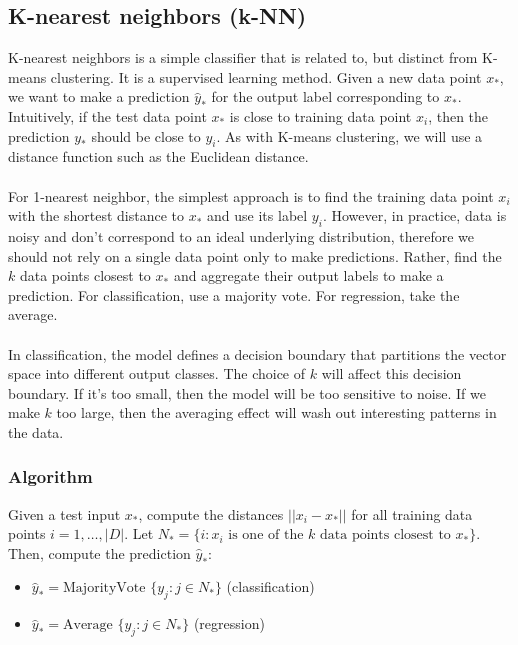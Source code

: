\documentclass[11pt]{article}
\begin{document}
\subsection{K-nearest neighbors (k-NN)}
K-nearest neighbors is a simple classifier that is related to, but distinct from K-means clustering.
It is a supervised learning method. Given a new data point $x_{\ast}$, we want to make a prediction $\hat{y}_{\ast}$ for the output label corresponding to $x_{\ast}$.
Intuitively, if the test data point $x_{\ast}$ is close to training data point $x_i$, then the prediction $y_{\ast}$ should be close to $y_i$. 
As with K-means clustering, we will use a distance function such as the Euclidean distance.
\\\\
For 1-nearest neighbor, the simplest approach is to find the training data point $x_i$ with the shortest distance to $x_{\ast}$ and use its label $y_i$.
However, in practice, data is noisy and don't correspond to an ideal underlying distribution, therefore we should not rely on a single data point only to make predictions.
Rather, find the $k$ data points closest to $x_{\ast}$ and aggregate their output labels to make a prediction. 
For classification, use a majority vote. For regression, take the average.
\\\\
In classification, the model defines a decision boundary that partitions the vector space into different output classes. 
The choice of $k$ will affect this decision boundary. If it's too small, then the model will be too sensitive to noise.
If we make $k$ too large, then the averaging effect will wash out interesting patterns in the data.
\subsubsection{Algorithm}
Given a test input $x_{\ast}$, compute the distances $||x_i-x_{\ast}||$ for all training data points $i=1,\dots,|D|$.
Let $N_{\ast}=\{i:x_i\text{ is one of the }k\text{ data points closest to }x_{\ast}\}$. Then, compute the prediction $\hat{y}_{\ast}$:
\begin{itemize}
    \item $\hat{y}_{\ast}=\text{MajorityVote }\{y_j:j\in N_{\ast}\}$ (classification)
    \item $\hat{y}_{\ast}=\text{Average }\{y_j:j\in N_{\ast}\}$ (regression)
\end{itemize}
\end{document}

